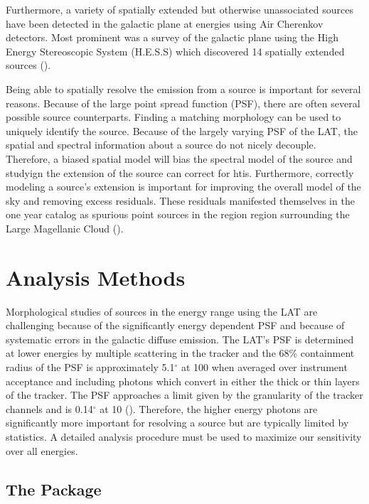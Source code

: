 \documentclass[12pt,preprint]{aastex}
\newcommand{\mev}{\text{MeV}\xspace}
\newcommand{\gev}{\text{GeV}\xspace}
\newcommand{\tev}{\text{TeV}\xspace}
\renewcommand{\deg}{\ensuremath{^\circ}\xspace}
\newcommand{\pointlike}{\text{\em pointlike}\xspace}
\begin{document}
Furthermore, a variety of spatially extended but otherwise unassociated
sources have been detected in the galactic plane at \tev energies using
Air Cherenkov detectors. Most prominent was a survey of the galactic plane
using the High Energy Stereoscopic System (H.E.S.S) which discovered 14
spatially extended sources (\cite{HESS_plane_survey}).

Being able to spatially resolve the \gev emission from a source is
important for several reasons. Because of the large point spread
function (PSF), there are often several possible source counterparts.
Finding a matching morphology can be used to uniquely identify the source.
Because of the largely varying PSF of the LAT, the spatial and spectral
information about a source do not nicely decouple. Therefore, a biased
spatial model will bias the spectral model of the source and studyign
the extension of the source can correct for htis.  Furthermore, correctly
modeling a source's extension is important for improving the overall model
of the sky and removing excess residuals.  These residuals manifested
themselves in the one year catalog as spurious point sources in the
region region surrounding the Large Magellanic Cloud (\cite{first_cat}).


\section{Analysis Methods}

Morphological studies of sources in the \gev energy range
using the LAT are challenging because of the significantly energy
dependent PSF and because of systematic errors in the galactic diffuse
emission.  The LAT's PSF is determined at lower energies by multiple
scattering in the tracker and the 68\% containment radius of the PSF is
approximately 5.1\deg at 100 \mev  when averaged over instrument acceptance
and including photons which convert in either the thick or thin layers of
the tracker. The PSF approaches a limit given by the granularity of the
tracker channels and is 0.14\deg at 10 \gev (\cite{on_orbit_calibration}).
Therefore, the higher energy photons are significantly more important for
resolving a source but are typically limited by statistics. 
A detailed analysis procedure must be used to maximize our
sensitivity over all energies.

\subsection{The \pointlike Package}
\end{document}
